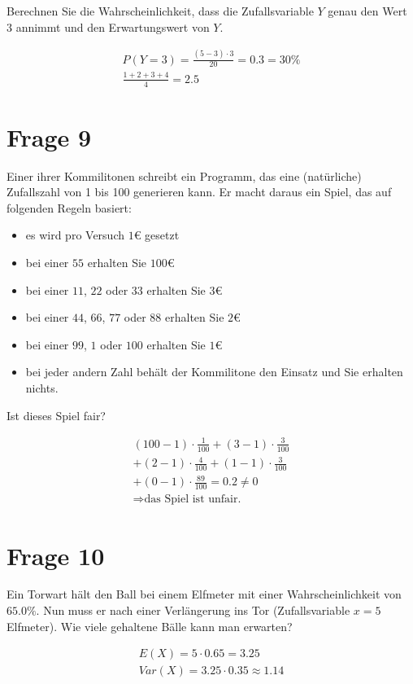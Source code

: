 Berechnen Sie die Wahrscheinlichkeit, dass die Zufallsvariable $Y$ genau den Wert $3$ annimmt und den Erwartungswert von $Y$.

\begin{align*}
    P(Y = 3) = \frac{(5 - 3) \cdot 3}{20} = 0.3 = 30\% \\
    \frac{1 + 2 + 3 + 4}{4} = 2.5
\end{align*}

\section{Frage 9}

Einer ihrer Kommilitonen schreibt ein Programm, das eine (natürliche) Zufallszahl von 1 bis 100 generieren kann. Er macht daraus ein Spiel, das auf folgenden Regeln basiert:

\begin{itemize}
    \item es wird pro Versuch $1$€ gesetzt
    \item bei einer $55$ erhalten Sie $100$€
    \item bei einer $11$, $22$ oder $33$ erhalten Sie $3$€
    \item bei einer $44$, $66$, $77$ oder $88$ erhalten Sie $2$€
    \item bei einer $99$, $1$ oder $100$ erhalten Sie $1$€
    \item bei jeder andern Zahl behält der Kommilitone den Einsatz und Sie erhalten nichts.
\end{itemize}

Ist dieses Spiel fair?

\begin{align*}
    (100 - 1) \cdot \frac{1}{100} + (3 - 1) \cdot \frac{3}{100}\\
    + (2 - 1) \cdot\frac{4}{100} + (1 - 1) \cdot \frac{3}{100}\\
    + (0 - 1) \cdot \frac{89}{100} = 0.2 \neq 0 \\
    \Rightarrow \text{das Spiel ist unfair.}
\end{align*}

\section{Frage 10}

Ein Torwart hält den Ball bei einem Elfmeter mit einer Wahrscheinlichkeit von $65.0\%$. Nun muss er nach einer Verlängerung ins Tor (Zufallsvariable $x=5$ Elfmeter). Wie viele gehaltene Bälle kann man erwarten?

\begin{align*}
    E(X) = 5 \cdot  0.65 = 3.25 \\
    Var(X) = 3.25 \cdot 0.35 \approx 1.14
\end{align*}